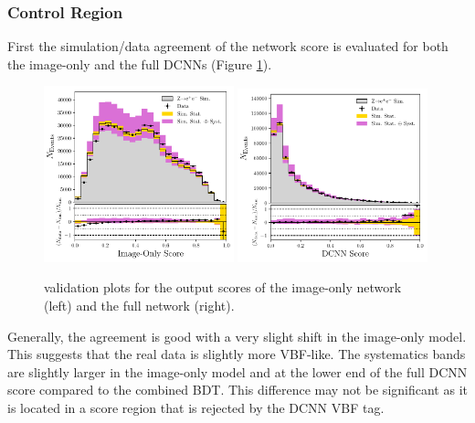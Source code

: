 \subsubsection{\Zee Control Region}
First the simulation/data agreement of the network score is evaluated for both the image-only and the full DCNNs (Figure \ref{fig:event_categorisation:int_score_zee}). 
\begin{figure}[h!]
    \begin{center}
        \includegraphics[width=0.49\textwidth]{figures/event_selection/img_score_zee_LPS.pdf}
        \includegraphics[width=0.49\textwidth]{figures/event_selection/int_score_zee_LPS.pdf}
    \end{center}
    \caption{\Zee validation plots for the output scores of the image-only network (left) and the full network (right).}
    \label{fig:event_categorisation:int_score_zee}
\end{figure}

Generally, the agreement is good with a very slight shift in the image-only model. This suggests that the real data is slightly more VBF-like. 
The systematics bands are slightly larger in the image-only model and at the lower end of the full DCNN score compared to the combined BDT. This difference may not be significant as it is located in a score region that is rejected by the DCNN VBF tag.  


